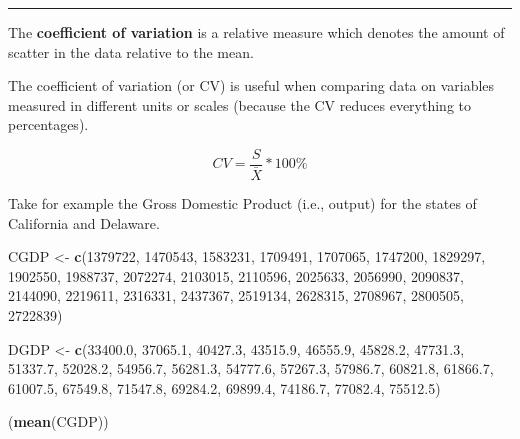 \documentclass[
]{book}
\newenvironment{Shaded}{\begin{snugshade}}{\end{snugshade}}
\newcommand{\DecValTok}[1]{\textcolor[rgb]{0.00,0.00,0.81}{#1}}
\newcommand{\FloatTok}[1]{\textcolor[rgb]{0.00,0.00,0.81}{#1}}
\newcommand{\FunctionTok}[1]{\textcolor[rgb]{0.13,0.29,0.53}{\textbf{#1}}}
\newcommand{\NormalTok}[1]{#1}
\newcommand{\OtherTok}[1]{\textcolor[rgb]{0.56,0.35,0.01}{#1}}
\begin{document}
\begin{center}\rule{0.5\linewidth}{0.5pt}\end{center}

The \textbf{coefficient of variation} is a relative measure which denotes the amount of scatter in the data relative to the mean.

The coefficient of variation (or CV) is useful when comparing data on variables measured in different units or scales (because the CV reduces everything to percentages).

\[CV=\frac{S}{\bar{X}}*100\%\]

Take for example the Gross Domestic Product (i.e., output) for the states of California and Delaware.

\begin{Shaded}
\begin{Highlighting}[]
\NormalTok{CGDP }\OtherTok{\textless{}{-}} \FunctionTok{c}\NormalTok{(}\DecValTok{1379722}\NormalTok{, }\DecValTok{1470543}\NormalTok{, }\DecValTok{1583231}\NormalTok{, }\DecValTok{1709491}\NormalTok{, }\DecValTok{1707065}\NormalTok{, }\DecValTok{1747200}\NormalTok{, }\DecValTok{1829297}\NormalTok{,}
          \DecValTok{1902550}\NormalTok{, }\DecValTok{1988737}\NormalTok{, }\DecValTok{2072274}\NormalTok{, }\DecValTok{2103015}\NormalTok{, }\DecValTok{2110596}\NormalTok{, }\DecValTok{2025633}\NormalTok{, }\DecValTok{2056990}\NormalTok{,}
          \DecValTok{2090837}\NormalTok{, }\DecValTok{2144090}\NormalTok{, }\DecValTok{2219611}\NormalTok{, }\DecValTok{2316331}\NormalTok{, }\DecValTok{2437367}\NormalTok{, }\DecValTok{2519134}\NormalTok{, }\DecValTok{2628315}\NormalTok{,}
          \DecValTok{2708967}\NormalTok{, }\DecValTok{2800505}\NormalTok{, }\DecValTok{2722839}\NormalTok{)}

\NormalTok{DGDP }\OtherTok{\textless{}{-}} \FunctionTok{c}\NormalTok{(}\FloatTok{33400.0}\NormalTok{, }\FloatTok{37065.1}\NormalTok{, }\FloatTok{40427.3}\NormalTok{, }\FloatTok{43515.9}\NormalTok{, }\FloatTok{46555.9}\NormalTok{, }\FloatTok{45828.2}\NormalTok{, }\FloatTok{47731.3}\NormalTok{,}
          \FloatTok{51337.7}\NormalTok{, }\FloatTok{52028.2}\NormalTok{, }\FloatTok{54956.7}\NormalTok{, }\FloatTok{56281.3}\NormalTok{, }\FloatTok{54777.6}\NormalTok{, }\FloatTok{57267.3}\NormalTok{, }\FloatTok{57986.7}\NormalTok{,}
          \FloatTok{60821.8}\NormalTok{, }\FloatTok{61866.7}\NormalTok{, }\FloatTok{61007.5}\NormalTok{, }\FloatTok{67549.8}\NormalTok{, }\FloatTok{71547.8}\NormalTok{, }\FloatTok{69284.2}\NormalTok{, }\FloatTok{69899.4}\NormalTok{,}
          \FloatTok{74186.7}\NormalTok{, }\FloatTok{77082.4}\NormalTok{, }\FloatTok{75512.5}\NormalTok{)}

\NormalTok{(}\FunctionTok{mean}\NormalTok{(CGDP))}
\end{Highlighting}
\end{Shaded}
\end{document}
